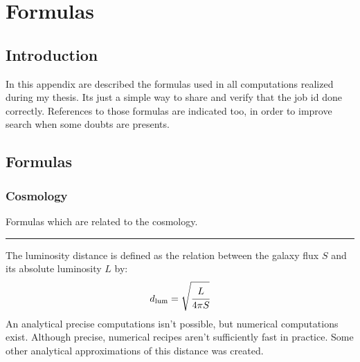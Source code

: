 \chapter{Formulas}

\section{Introduction}

In this appendix are described the formulas used in all computations realized
during my thesis. Its just a simple way to share and verify that the job id
done correctly. References to those formulas are indicated too, in order to
improve search when some doubts are presents.

\section{Formulas}

\subsection{Cosmology}

Formulas which are related to the cosmology.

\noindent\rule{\linewidth}{1pt}
%
The luminosity distance is defined as the relation between the galaxy flux $S$
and its absolute luminosity $L$ by:
%
\begin{equation}
	d_{\mathrm{lum}}=\sqrt{\cfrac{L}{4\pi{S}}}
\end{equation}
%
An analytical precise computations isn't possible, but numerical computations
exist. Although precise, numerical recipes aren't sufficiently fast in
practice. Some other analytical approximations of this distance was created.


